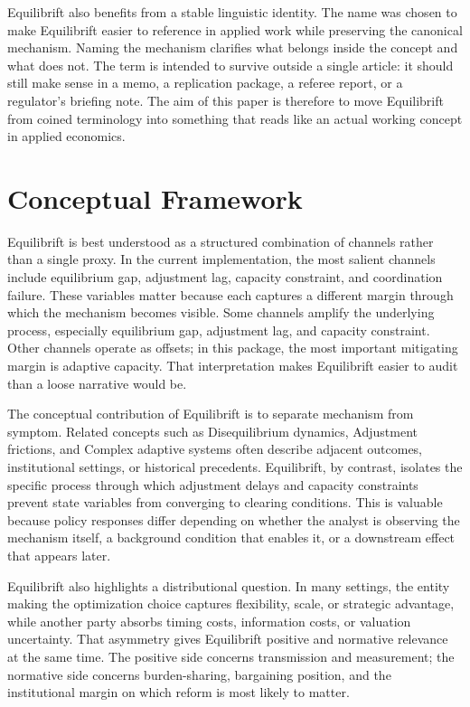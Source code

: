 \documentclass[12pt]{article}
\begin{document}
Equilibrift also benefits from a stable linguistic identity. The name was chosen to make Equilibrift easier to reference in applied work while preserving the canonical mechanism. Naming the mechanism clarifies what belongs inside the concept and what does not. The term is intended to survive outside a single article: it should still make sense in a memo, a replication package, a referee report, or a regulator's briefing note. The aim of this paper is therefore to move Equilibrift from coined terminology into something that reads like an actual working concept in applied economics.

\section{Conceptual Framework}
Equilibrift is best understood as a structured combination of channels rather than a single proxy. In the current implementation, the most salient channels include equilibrium gap, adjustment lag, capacity constraint, and coordination failure. These variables matter because each captures a different margin through which the mechanism becomes visible. Some channels amplify the underlying process, especially equilibrium gap, adjustment lag, and capacity constraint. Other channels operate as offsets; in this package, the most important mitigating margin is adaptive capacity. That interpretation makes Equilibrift easier to audit than a loose narrative would be.

The conceptual contribution of Equilibrift is to separate mechanism from symptom. Related concepts such as Disequilibrium dynamics, Adjustment frictions, and Complex adaptive systems often describe adjacent outcomes, institutional settings, or historical precedents. Equilibrift, by contrast, isolates the specific process through which adjustment delays and capacity constraints prevent state variables from converging to clearing conditions. This is valuable because policy responses differ depending on whether the analyst is observing the mechanism itself, a background condition that enables it, or a downstream effect that appears later.

Equilibrift also highlights a distributional question. In many settings, the entity making the optimization choice captures flexibility, scale, or strategic advantage, while another party absorbs timing costs, information costs, or valuation uncertainty. That asymmetry gives Equilibrift positive and normative relevance at the same time. The positive side concerns transmission and measurement; the normative side concerns burden-sharing, bargaining position, and the institutional margin on which reform is most likely to matter.
\end{document}
